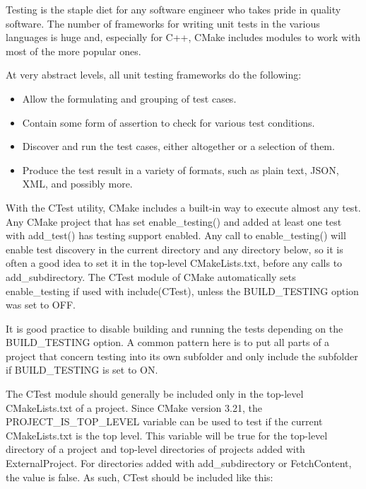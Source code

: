 Testing is the staple diet for any software engineer who takes pride in quality software. The number of frameworks for writing unit tests in the various languages is huge and, especially for C++, CMake includes modules to work with most of the more popular ones.

At very abstract levels, all unit testing frameworks do the following:

\begin{itemize}
\item 
Allow the formulating and grouping of test cases.

\item 
Contain some form of assertion to check for various test conditions.

\item 
Discover and run the test cases, either altogether or a selection of them.

\item 
Produce the test result in a variety of formats, such as plain text, JSON, XML, and possibly more.
\end{itemize}

With the CTest utility, CMake includes a built-in way to execute almost any test. Any CMake project that has set enable\_testing() and added at least one test with add\_test() has testing support enabled. Any call to enable\_testing() will enable test discovery in the current directory and any directory below, so it is often a good idea to set it in the top-level CMakeLists.txt, before any calls to add\_subdirectory. The CTest module of CMake automatically sets enable\_testing if used with include(CTest), unless the BUILD\_TESTING option was set to OFF.

It is good practice to disable building and running the tests depending on the BUILD\_TESTING option. A common pattern here is to put all parts of a project that concern testing into its own subfolder and only include the subfolder if BUILD\_TESTING is set to ON.

The CTest module should generally be included only in the top-level CMakeLists.txt of a project. Since CMake version 3.21, the PROJECT\_IS\_TOP\_LEVEL variable can be used to test if the current CMakeLists.txt is the top level. This variable will be true for the top-level directory of a project and top-level directories of projects added with ExternalProject. For directories added with add\_subdirectory or FetchContent, the value is false. As such, CTest should be included like this:

